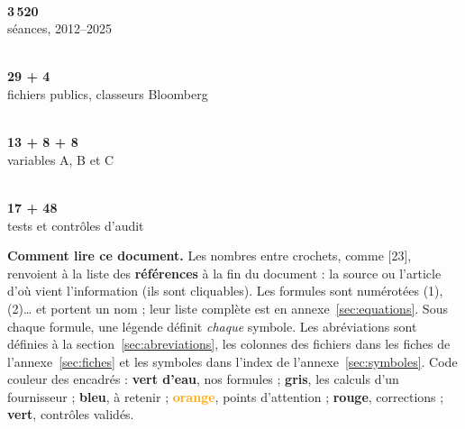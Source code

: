 \documentclass[10pt,a4paper]{article}
\begin{document}
\begin{tcbraster}[raster columns=4,raster equal height,raster column skip=6pt,raster before skip=2pt,raster after skip=4pt]
\begin{tcolorbox}[tuile]{\color{sarcelle}\Large{}}\\[2pt]{\Large\bfseries\color{marine}3\,520}\\{\small séances, 2012–2025}\end{tcolorbox}
\begin{tcolorbox}[tuile]{\color{sarcelle}\Large{}}\\[2pt]{\Large\bfseries\color{marine}29 + 4}\\{\small fichiers publics, classeurs Bloomberg}\end{tcolorbox}
\begin{tcolorbox}[tuile]{\color{sarcelle}\Large{}}\\[2pt]{\Large\bfseries\color{marine}13 + 8 + 8}\\{\small variables A, B et C}\end{tcolorbox}
\begin{tcolorbox}[tuile]{\color{sarcelle}\Large{}}\\[2pt]{\Large\bfseries\color{marine}17 + 48}\\{\small tests et contrôles d'audit}\end{tcolorbox}
\end{tcbraster}

\textbf{Comment lire ce document.} Les nombres entre crochets, comme [23], renvoient à la liste des \textbf{références} à la fin du document : la source ou l'article d'où vient l'information (ils sont cliquables). Les formules sont numérotées (1), (2)… et portent un nom ; leur liste complète est en annexe~\ref{sec:equations}. Sous chaque formule, une légende définit \emph{chaque} symbole. Les abréviations sont définies à la section~\ref{sec:abreviations}, les colonnes des fichiers dans les fiches de l'annexe~\ref{sec:fiches} et les symboles dans l'index de l'annexe~\ref{sec:symboles}. Code couleur des encadrés : \textcolor{sarcelle}{\textbf{vert d'eau}}, nos formules ; \textcolor{discret}{\textbf{gris}}, les calculs d'un fournisseur ; \textcolor{marine}{\textbf{bleu}}, à retenir ; \textcolor{orange}{\textbf{orange}}, points d'attention ; \textcolor{rouge}{\textbf{rouge}}, corrections ; \textcolor{vert}{\textbf{vert}}, contrôles validés.

\end{document}
